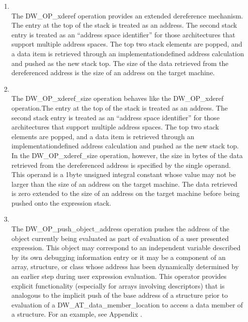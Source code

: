 \begin{enumerate}[1]
\item {} \\
The DW\-\_OP\-\_xderef operation provides an extended dereference
mechanism. The entry at the top of the stack is treated as an
address. The second stack entry is treated as an “address
space identifier” for those architectures that support
multiple address spaces. The top two stack elements are popped,
and a data item is retrieved through an implementation\dash defined
address calculation and pushed as the new stack top. The size
of the data retrieved from the dereferenced address is the
size of an address on the target machine.

\item {}\\
The DW\-\_OP\-\_xderef\-\_size operation behaves like the
DW\-\_OP\-\_xderef operation.The entry at the top of the stack is
treated as an address. The second stack entry is treated as
an “address space identifier” for those architectures
that support multiple address spaces. The top two stack
elements are popped, and a data item is retrieved through an
implementation\dash defined address calculation and pushed as the
new stack top. In the DW\-\_OP\-\_xderef\-\_size operation, however,
the size in bytes of the data retrieved from the dereferenced
address is specified by the single operand. This operand is a
1\dash byte unsigned integral constant whose value may not be larger
than the size of an address on the target machine. The data
retrieved is zero extended to the size of an address on the
target machine before being pushed onto the expression stack.

\item {}\\
The DW\-\_OP\-\_push\-\_object\-\_address operation pushes the address
of the object currently being evaluated as part of evaluation
of a user presented expression. This object may correspond
to an independent variable described by its own debugging
information entry or it may be a component of an array,
structure, or class whose address has been dynamically
determined by an earlier step during user expression
evaluation.  This operator provides explicit functionality
(especially for arrays involving descriptors) that is analogous
to the implicit push of the base address of a structure prior
to evaluation of a DW\-\_AT\-\_data\-\_member\-\_location to access a
data member of a structure. For an example, see 
Appendix .


\end{enumerate}
